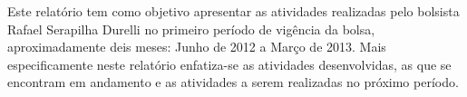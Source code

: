 Este relatório tem como objetivo apresentar as atividades realizadas pelo bolsista Rafael Serapilha Durelli no primeiro período de vigência da bolsa, aproximadamente deis meses: Junho de 2012 a Março de 2013. 
Mais especificamente neste relatório enfatiza-se as atividades desenvolvidas, as que se encontram em andamento e as atividades a serem realizadas no próximo período.